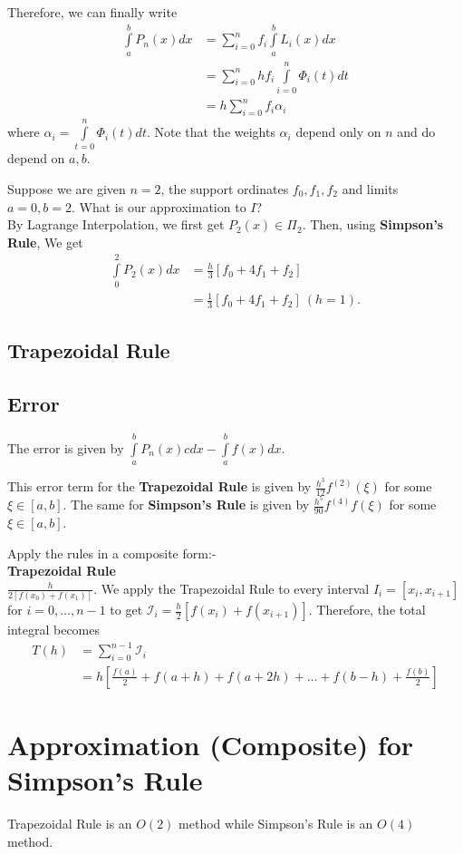Therefore, we can finally write 
\begin{align*}
    \int \limits _a ^b P_n(x) dx &= \sum \limits _{i=0} ^n f_i \int \limits _a^b L_i(x) dx \\
                                 &= \sum \limits  _{i=0} ^n h f_i \int \limits _{i=0}^n \Phi _i(t) dt \\
                                 &= h \sum \limits _{i=0}^n f_i \alpha_i
\end{align*}
where $\alpha _i = \int \limits _{t=0} ^n \Phi _i (t) dt$. Note that the weights $\alpha _i$ 
depend only on  $n$ and do depend on  $a,b$. 

\begin{example}
    Suppose we are given $n=2$, the support ordinates $f_0,f_1,f_2$ and limits $a=0, b=2$. 
    What is our approximation to  $I$?
    \\
    By Lagrange Interpolation, we first get $P_2(x) \in \Pi _2$. Then, using \textbf{Simpson's Rule}, We get
    \begin{align*}
        \int \limits _0^2 P_2(x) dx &= \frac{h}{3} [f_0 + 4f_1 +f_2]\\
                                    &= \frac{1}{3}[f_0 + 4f_1 +f_2] \  (h=1)
    .\end{align*}
\end{example}


\subsection{Trapezoidal Rule}

\subsection{Error}

The error is given by $\int \limits _a^b P_n(x)cdx - \int \limits _a^b f(x) dx$.

This error term for the \textbf{Trapezoidal Rule} is given by  $\frac{h^{3}}{12}f^{(2)}( \xi )$ 
for some $\xi \in [a,b]$. The same for \textbf{Simpson's Rule} is given by  
$\frac{h^5}{90}f^{(4)}f(\xi)$ for some $\xi \in [a,b]$.

Apply the rules in a composite form:- \\
\textbf{Trapezoidal Rule}\\
$\frac{h}{2[f(x_0) + f(x_1)]}$. We apply the Trapezoidal Rule to every interval 
$I_i = [x_i, x_{i+1}]$ for $i = 0, \ldots ,n-1$ to get $\mathscr{I} _i = \frac{h}{2} [f(x_i)
 + f(x_{i+1})]$. Therefore, the total integral becomes 
 \begin{align*}
     T(h) &= \sum \limits _{i=0} ^{n-1} \mathscr{I} _i \\
          &= h[\frac{f(a)}{2} + f(a+h) + f(a+2h) + \ldots + f(b-h) + \frac{f(b)}{2}]
 \end{align*}
 
 \section{Approximation (Composite) for Simpson's Rule}

 Trapezoidal Rule is an $O(2)$ method while Simpson's Rule is an $O(4)$ method.



